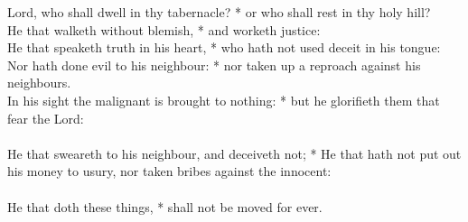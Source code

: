 \begin{Parallel}[v]{\colw}{\colx}
{}
{\vern
{\noindent
Lord, who shall dwell in thy tabernacle? * or who shall rest in thy holy hill?\\
He that walketh without blemish, * and worketh justice:\\
He that speaketh truth in his heart, * who hath not used deceit in his tongue:\\
Nor hath done evil to his neighbour: * nor taken up a reproach against his neighbours.\\
In his sight the malignant is brought to nothing: * but he glorifieth them that fear the Lord:\\ \\
He that sweareth to his neighbour, and deceiveth not; * He that hath not put out his money to usury, nor taken bribes against the innocent:\\ \\
He that doth these things, * shall not be moved for ever.}}

\end{Parallel}


